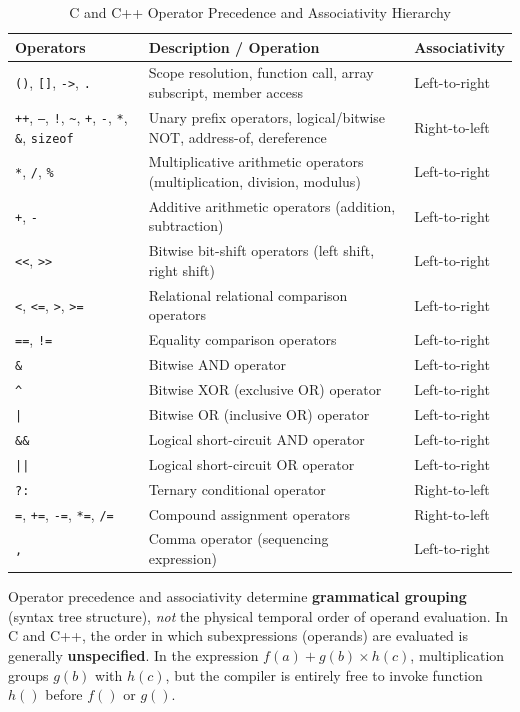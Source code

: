 \begin{table}[htbp]
\centering
\small
\begin{tabularx}{\textwidth}{l X l}
\toprule
\textbf{Operators} & \textbf{Description / Operation} & \textbf{Associativity} \\
\midrule
\texttt{()}, \texttt{[]}, \texttt{->}, \texttt{.} & Scope resolution, function call, array subscript, member access & Left-to-right \\
\texttt{++}, \texttt{--}, \texttt{!}, \texttt{\~{}}, \texttt{+}, \texttt{-}, \texttt{*}, \texttt{\&}, \texttt{sizeof} & Unary prefix operators, logical/bitwise NOT, address-of, dereference & Right-to-left \\
\texttt{*}, \texttt{/}, \texttt{\%} & Multiplicative arithmetic operators (multiplication, division, modulus) & Left-to-right \\
\texttt{+}, \texttt{-} & Additive arithmetic operators (addition, subtraction) & Left-to-right \\
\texttt{<<}, \texttt{>>} & Bitwise bit-shift operators (left shift, right shift) & Left-to-right \\
\texttt{<}, \texttt{<=}, \texttt{>}, \texttt{>=} & Relational relational comparison operators & Left-to-right \\
\texttt{==}, \texttt{!=} & Equality comparison operators & Left-to-right \\
\texttt{\&} & Bitwise AND operator & Left-to-right \\
\texttt{\^{}} & Bitwise XOR (exclusive OR) operator & Left-to-right \\
\texttt{|} & Bitwise OR (inclusive OR) operator & Left-to-right \\
\texttt{\&\&} & Logical short-circuit AND operator & Left-to-right \\
\texttt{||} & Logical short-circuit OR operator & Left-to-right \\
\texttt{?:} & Ternary conditional operator & Right-to-left \\
\texttt{=}, \texttt{+=}, \texttt{-=}, \texttt{*=}, \texttt{/=} & Compound assignment operators & Right-to-left \\
\texttt{,} & Comma operator (sequencing expression) & Left-to-right \\
\bottomrule
\end{tabularx}
\caption{C and C++ Operator Precedence and Associativity Hierarchy}
\label{tab:c_operator_precedence}
\end{table}

\begin{tcolorbox}[colback=blockbg,colframe=primary,title=\textbf{Important Distinction: Precedence vs. Evaluation Order}]
Operator precedence and associativity determine \textbf{grammatical grouping} (syntax tree structure), \textit{not} the physical temporal order of operand evaluation. In C and C++, the order in which subexpressions (operands) are evaluated is generally \textbf{unspecified}. In the expression $f(a) + g(b) \times h(c)$, multiplication groups $g(b)$ with $h(c)$, but the compiler is entirely free to invoke function $h()$ before $f()$ or $g()$.
\end{tcolorbox}

